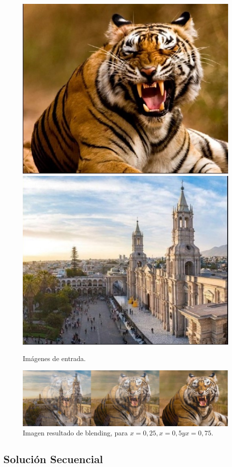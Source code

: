 \documentclass[https://www.overleaf.com/project/63761df255a8a9f4a15c3579
	letterpaper, %
	10pt, %
]{CSUniSchoolLabReport}
\begin{document}
\begin{figure}[H]
    \centering 
    \includegraphics[width=.4\textwidth]{images/9.jpg}
    \includegraphics[width=.4\textwidth]{images/10.jpg}
    \caption{Imágenes de entrada.}
    \label{fig}
\end{figure}

\begin{figure}[H]
    \centering 
    \includegraphics[width=1\textwidth]{images/12.jpg}
    \caption{Imagen resultado de blending, para \(x = 0,25, x = 0,5 y x = 0,75\).}
    \label{fig}
\end{figure}
\subsection*{Solución Secuencial}


\end{document}
